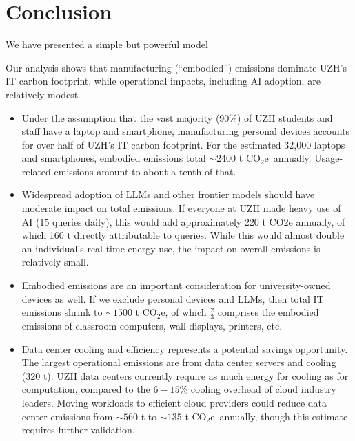 \documentclass[11pt]{article}
\newcommand{\coe}{CO$_2$e}
\newcommand{\tcoe}{t \coe}
\begin{document}
\section{Conclusion}

We have presented a simple but powerful model

Our analysis shows that manufacturing (“embodied”) emissions dominate UZH's IT carbon footprint, while operational impacts, including AI adoption, are relatively modest.

\begin{itemize}

  \item Under the assumption that the vast majority (90\%) of UZH students and staff have a laptop and smartphone, manufacturing personal devices accounts for over half of UZH's IT carbon footprint. For the estimated 32,000 laptops and smartphones, embodied emissions total $\sim 2400$ \tcoe\ annually. Usage-related emissions amount to about a tenth of that.

  \item Widespread adoption of LLMs and other frontier models should have moderate impact on total emissions. If everyone at UZH made heavy use of AI (15 queries daily), this would add approximately 220 t CO2e annually, of which 160 t directly attributable to queries. While this would almost double an individual's real-time energy use, the impact on overall emissions is relatively small.

  \item Embodied emissions are an important consideration for university-owned devices as well. If we exclude personal devices and LLMs, then total IT emissions shrink to $\sim 1500$ \tcoe, of which $\frac{2}{3}$ comprises the embodied emissions of classroom computers, wall displays, printers, etc.

  \item Data center cooling and efficiency represents a potential savings opportunity. The largest operational emissions are from data center servers and cooling (320 t). UZH data centers currently require as much energy for cooling as for computation, compared to the $6-15\%$ cooling overhead of cloud industry leaders. Moving workloads to efficient cloud providers could reduce data center emissions from $\sim 560$ t to $\sim 135$ \tcoe\ annually, though this estimate requires further validation.

\end{itemize}

\printbibliography
\end{document}
